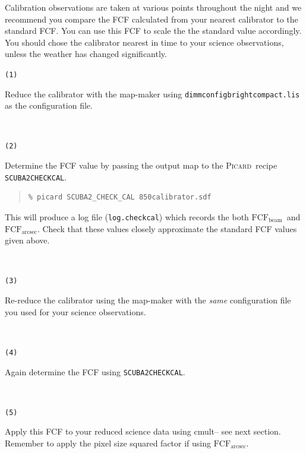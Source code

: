 \documentclass[twoside,11pt]{article}
\newcommand{\xref}[3]{#1}
\renewcommand{\_}{\texttt{\symbol{95}}}
\newenvironment{myquote}{\begin{quote}\begin{small}}{\end{small}\end{quote}}
\newcommand{\fcfb}{$\mathrm{FCF_{beam}}$}
\newcommand{\fcfa}{$\mathrm{FCF_{arcsec}}$}
\newcommand{\picard}{\xref{\textsc{Picard}}{sun265}{}}
\newcommand{\drrecipe}[1]{\texttt{#1}}
\newcommand{\task}[1]{\textsf{#1}}
\newcommand{\cmult}{\xref{\task{cmult}}{sun95}{CMULT}}
\begin{document}
Calibration observations are taken at various points throughout the
night and we recommend you compare the FCF calculated from your
nearest calibrator to the standard FCF. You can use this FCF to scale
the the standard value accordingly. You should chose the calibrator
nearest in time to your science observations, unless the weather has
changed significantly.
\vspace{1mm}\\
\begin{minipage}[t]{0.05\linewidth}
\texttt{(1)}
\end{minipage}
\begin{minipage}[t]{0.95\linewidth}
Reduce the calibrator with the map-maker using
\texttt{dimmconfig\_bright\_compact.lis} as the configuration file.
\end{minipage}
\vspace{1mm}\\
\begin{minipage}[t]{0.05\linewidth}
\texttt{(2)}
\end{minipage}
\begin{minipage}[t]{0.95\linewidth}
Determine the FCF value by passing the output map to the
\picard\ recipe \xref{\drrecipe{SCUBA2\_CHECK\_CAL}}{sun265}{SCUBA2_CHECK_CAL}.
\begin{myquote}
\begin{verbatim}
% picard SCUBA2_CHECK_CAL 850calibrator.sdf
\end{verbatim}
\end{myquote}
This will produce a log file (\texttt{log.checkcal}) which records the both
\fcfb\ and \fcfa. Check that these values closely approximate the
standard FCF values given above.
\end{minipage}
\vspace{1mm}\\
\begin{minipage}[t]{0.05\linewidth}
\texttt{(3)}
\end{minipage}
\begin{minipage}[t]{0.95\linewidth}
Re-reduce the calibrator using the map-maker with the \emph{same}
configuration file you used for your science observations.
\end{minipage}
\vspace{1mm}\\
\begin{minipage}[t]{0.05\linewidth}
\texttt{(4)}
\end{minipage}
\begin{minipage}[t]{0.95\linewidth}
Again determine the FCF using \drrecipe{SCUBA2\_CHECK\_CAL}.
\end{minipage}
\vspace{1mm}\\
\begin{minipage}[t]{0.05\linewidth}
\texttt{(5)}
\end{minipage}
\begin{minipage}[t]{0.95\linewidth}
Apply this FCF to your reduced science data using \cmult-- see next
section. Remember to apply the pixel size squared factor if using
\fcfa.
\end{minipage}
\end{document}
